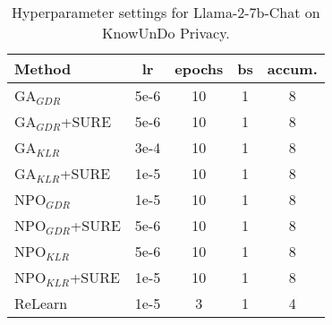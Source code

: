 \begin{table}[t]
    \centering
    \small
    \renewcommand{\arraystretch}{1.1}
    \setlength{\tabcolsep}{4pt}
    \begin{tabular}{l|c|c|c|c}
    \hline
    \textbf{Method} & \textbf{lr} & \textbf{epochs} & \textbf{bs} & \textbf{accum.} \\
    \hline
    GA$_{GDR}$ & 5e-6 & 10 & 1 & 8 \\
    GA$_{GDR}$+SURE & 5e-6 & 10 & 1 & 8 \\
    GA$_{KLR}$ & 3e-4 & 10 & 1 & 8 \\
    GA$_{KLR}$+SURE & 1e-5 & 10 & 1 & 8 \\
    NPO$_{GDR}$ & 1e-5 & 10 & 1 & 8 \\
    NPO$_{GDR}$+SURE & 5e-6 & 10 & 1 & 8 \\
    NPO$_{KLR}$ & 5e-6 & 10 & 1 & 8 \\
    NPO$_{KLR}$+SURE & 1e-5 & 10 & 1 & 8 \\
    ReLearn & 1e-5 & 3 & 1 & 4 \\
    \hline
    \end{tabular}
    \caption{Hyperparameter settings for Llama-2-7b-Chat on KnowUnDo Privacy.}
    \label{tab:hyperparams_llama2}
\end{table}